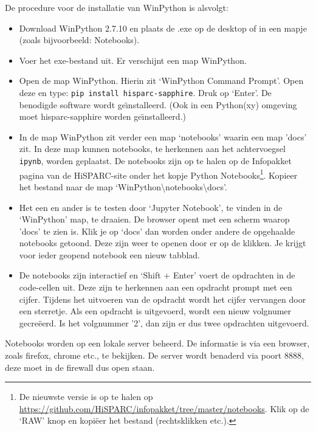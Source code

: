 De procedure voor de installatie van WinPython is alsvolgt:
\begin{itemize}
\item Download WinPython 2.7.10 en plaats de .exe op de desktop of in een mapje (zoals bijvoorbeeld: Notebooks).
\item Voer het exe-bestand uit. Er verschijnt een map WinPython.
\item Open de map WinPython. Hierin zit `WinPython Command Prompt'. Open deze en type:
 {\tt pip install hisparc-sapphire}. Druk op `Enter'. De benodigde \hisparc software wordt ge\"\i nstalleerd.
 (Ook in een Python(xy) omgeving moet hisparc-sapphire worden ge\"\i nstalleerd.)
\item In de map WinPython zit verder een map `notebooks' waarin een map 'docs' zit. In deze map kunnen notebooks,
te herkennen aan het achtervoegsel {\tt ipynb}, worden geplaatst. De notebooks zijn op te halen op de Infopakket pagina 
van de HiSPARC-site onder het kopje Python Notebooks\footnote{De nieuwste versie is op te halen op 
\url{https://github.com/HiSPARC/infopakket/tree/master/notebooks}. Klik op de `RAW' knop en kopi\"{e}er het bestand 
(rechtsklikken etc.).}. Kopieer het bestand naar de map `WinPython\textbackslash notebooks\textbackslash docs'.
\item Het een en ander is te testen door `Jupyter Notebook', te vinden in de `WinPython' map, te draaien. De browser
opent met een scherm waarop 'docs' te zien is. Klik je op `docs' dan worden onder andere de opgehaalde notebooks
getoond. Deze zijn weer te openen door er op de klikken. Je krijgt voor ieder geopend notebook een nieuw tabblad.
\item De notebooks zijn interactief en `Shift + Enter' voert de opdrachten in de code-cellen uit. Deze zijn te herkennen aan
een opdracht prompt met een cijfer. Tijdens het uitvoeren van de opdracht wordt het cijfer vervangen door een sterretje. Als 
een opdracht is uitgevoerd, wordt een nieuw volgnumer gecre\"{e}erd. Is het volgnummer '2', dan zijn er dus twee opdrachten 
uitgevoerd.
\end{itemize}

Notebooks worden op een lokale server beheerd. De informatie is via een browser, zoals firefox, chrome etc., te bekijken. 
De server wordt benaderd via poort 8888, deze moet in de firewall dus open staan.


